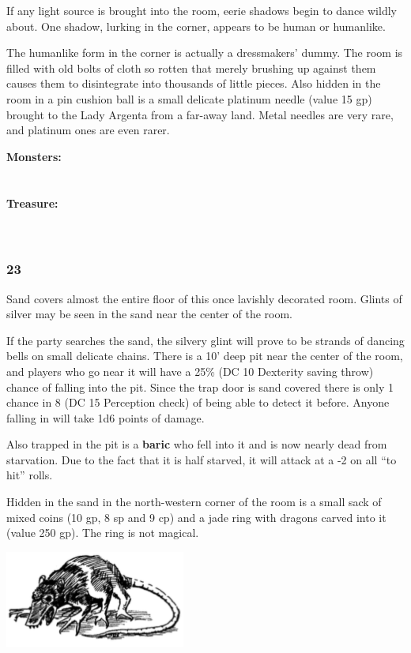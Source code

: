 \documentclass[palace_of_the_silver_princess]{subfiles}
\begin{document}
If any light source is brought into the room, eerie shadows begin to
dance wildly about. One shadow, lurking in the corner, appears to be
human or humanlike.

The humanlike form in the corner is actually a dressmakers’ dummy. The
room is filled with old bolts of cloth so rotten that merely brushing up
against them causes them to disintegrate into thousands of little
pieces. Also hidden in the room in a pin cushion ball is a small
delicate platinum needle (value 15 gp) brought to the Lady Argenta from
a far-away land. Metal needles are very rare, and platinum ones are
even rarer.

\textbf{Monsters:}
\\
\\
\\
\textbf{Treasure:}
\\
\\
\\

\subsubsection{23}
\begin{quotebox}
    Sand covers almost the entire floor of this once lavishly decorated
    room. Glints of silver may be seen in the sand near the center of
    the room.
\end{quotebox}

If the party searches the sand, the silvery glint will prove to be
strands of dancing bells on small delicate chains. There is a 10’ deep
pit near the center of the room, and players who go near it will have a
25\% (DC 10 Dexterity saving throw) chance of falling into the pit.
Since the trap door is sand covered there is only 1 chance in 8 (DC 15
Perception check) of being able to detect it before. Anyone falling in
will take 1d6 points of damage.

Also trapped in the pit is a \textbf{baric} who fell into it and is now
nearly dead from starvation. Due to the fact that it is half starved,
it will attack at a -2 on all “to hit” rolls.

Hidden in the sand in the north-western corner of the room is a small
sack of mixed coins (10 gp, 8 sp and 9 cp) and a jade ring with dragons
carved into it (value 250 gp). The ring is not magical.

\includegraphics[width=\columnwidth]{img/baric.png}
\end{document}
